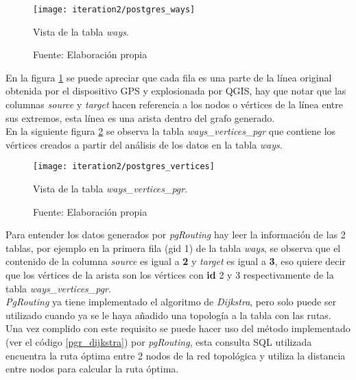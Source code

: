 \begin{figure}[H]
 \begin{center}
   \texttt{[image: iteration2/postgres\_ways]}
   \caption{Vista de la tabla \emph{ways}.}
   \label{fig:postgres_ways}
   \caption*{Fuente: Elaboración propia}
 \end{center}
\end{figure}

En la figura \ref{fig:postgres_ways} se puede apreciar que cada fila es una parte de la línea original obtenida por el dispositivo GPS y explosionada por QGIS, hay que notar que las columnas \emph{source} y \emph{target} hacen referencia a los nodos o vértices de la línea entre sus extremos, esta línea es una arista dentro del grafo generado.\\

En la siguiente figura \ref{fig:postgres_vertices} se observa la tabla \emph{ways\_vertices\_pgr} que contiene los vértices creados a partir del análisis de los datos en la tabla \emph{ways}.

\begin{figure}[H]
 \begin{center}
   \texttt{[image: iteration2/postgres\_vertices]}
   \caption{Vista de la tabla \emph{ways\_vertices\_pgr}.}
   \label{fig:postgres_vertices}
   \caption*{Fuente: Elaboración propia}
 \end{center}
\end{figure}

Para entender los datos generados por \emph{pgRouting} hay leer la información de las 2 tablas, por ejemplo en la primera  fila (gid 1) de la tabla \emph{ways}, se observa que el contenido de la columna \emph{source} es igual a \textbf{2} y \emph{target} es igual a \textbf{3}, eso quiere decir que los vértices de la arista son los vértices con \textbf{id} 2 y 3 respectivamente de la tabla \emph{ways\_vertices\_pgr}.\\


\emph{PgRouting} ya tiene implementado el algoritmo de \emph{Dijkstra}, pero solo puede ser utilizado cuando ya se le haya añadido una topología a la tabla con las rutas. Una vez complido con este requisito se puede hacer uso del método implementado (ver el código \ref{pgr_dijkstra}) por \emph{pgRouting}, esta consulta SQL utilizada encuentra la ruta óptima entre 2 nodos de la red topológica y utiliza la distancia entre nodos para calcular la ruta óptima.\\


